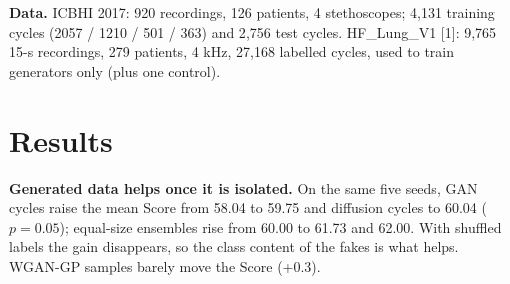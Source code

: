 \documentclass[twoside,english]{article}
\renewcommand{\cite}[1]{[#1]}
\begin{document}
\textbf{Data.} ICBHI 2017: 920 recordings, 126 patients, 4 stethoscopes; 4{,}131 training cycles (2057 / 1210 / 501 / 363) and 2{,}756 test cycles. HF\_Lung\_V1 \cite{1}: 9{,}765 15-s recordings, 279 patients, 4 kHz, 27{,}168 labelled cycles, used to train generators only (plus one control).

\section{Results}

\textbf{Generated data helps once it is isolated.} On the same five seeds, GAN cycles raise the mean Score from 58.04 to 59.75 and diffusion cycles to 60.04 ($p=0.05$); equal-size ensembles rise from 60.00 to 61.73 and 62.00. With shuffled labels the gain disappears, so the class content of the fakes is what helps. WGAN-GP samples barely move the Score (+0.3).

\begin{table}[!ht]
\centering\footnotesize
{}
\caption{Same AST, split, padding and recipe; only the generated data changes. Ensembles have equal size (5 models).}
\end{table}
\end{document}
